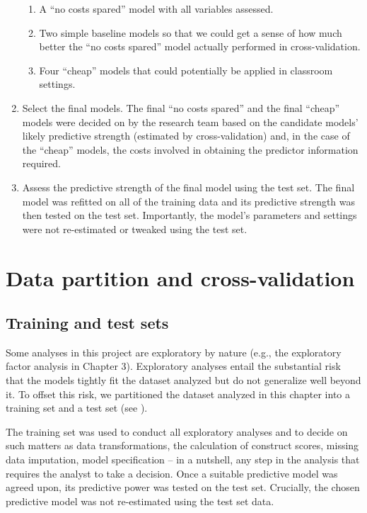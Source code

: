 \documentclass[output=paper]{langsci/langscibook}
\begin{document}
\begin{enumerate}
\begin{enumerate}[label=\alph*.]
\item A ``no costs spared'' model with all variables assessed.
\item Two simple baseline models so that we could get a sense of how much better the ``no costs spared'' model actually performed in cross-validation.
\item Four ``cheap'' models that could potentially be applied in classroom settings.
\end{enumerate}
\item Select the final models. The final ``no costs spared'' and the final ``cheap'' models were decided on by the research team based on the candidate models’ likely predictive strength (estimated by cross-validation) and, in the case of the ``cheap'' models, the costs involved in obtaining the predictor information required.
\item Assess the predictive strength of the final model using the test set. The final model was refitted on all of the training data and its predictive strength was then tested on the test set. Importantly, the model’s parameters and settings were not re-estimated or tweaked using the test set.
\end{enumerate}

\section{Data partition and cross-validation}
\subsection{Training and test sets}\label{sec:04:3.1}

Some analyses in this project are exploratory by nature (e.g., the exploratory factor analysis in Chapter 3). Exploratory analyses entail the substantial risk that the models tightly fit the dataset analyzed but do not generalize well beyond it. To offset this risk, we partitioned the dataset analyzed in this chapter into a training set and a test set (see \citealt{KuhnJohnson2013}).

The training set was used to conduct all exploratory analyses and to decide on such matters as data transformations, the calculation of construct scores, missing data imputation, model specification -- in a nutshell, any step in the analysis that requires the analyst to take a decision. Once a suitable predictive model was agreed upon, its predictive power was tested on the test set. Crucially, the chosen predictive model was not re-estimated using the test set data.
\end{document}
